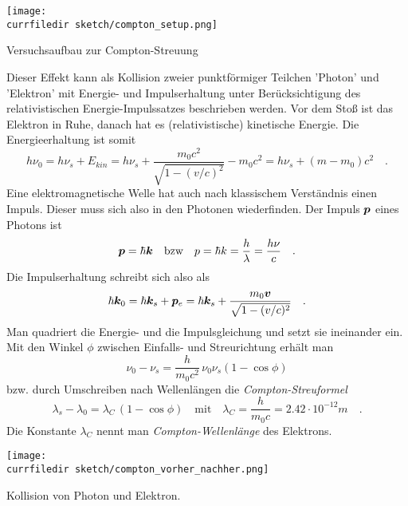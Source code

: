  \begin{marginfigure}
    \texttt{[image: \\currfiledir sketch/compton\_setup.png]}
    \caption{Versuchsaufbau zur Compton-Streuung}
\end{marginfigure}


 Dieser Effekt kann als Kollision zweier punktförmiger Teilchen 'Photon' und 'Elektron' mit Energie- und Impulserhaltung unter Berücksichtigung des relativistischen Energie-Impulssatzes beschrieben werden. Vor dem Stoß ist das Elektron in Ruhe, danach hat es (relativistische) kinetische Energie. Die Energieerhaltung ist somit
\begin{equation}
    h \nu_0 = h \nu_s + E_{kin} = h \nu_s + \frac{m_0 c^2}{\sqrt{1 - (v/c)^2}} - m_0 c^2 = h \nu_s + (m - m_0) c^2 \quad .
\end{equation}
Eine elektromagnetische Welle hat auch nach klassischem Verständnis einen Impuls. Dieser muss sich also in den Photonen wiederfinden. Der Impuls $\boldsymbol{p}$ eines Photons ist 
\begin{equation}
    \boldsymbol{p} = \hbar \boldsymbol{k} \quad \text{bzw} \quad p = \hbar k = \frac{h}{\lambda} = \frac{h \nu}{c} \quad .
    \label{eq:2_impuls_photon}
\end{equation}
Die Impulserhaltung schreibt sich also als
\begin{equation}
    \hbar \boldsymbol{k}_0 = \hbar \boldsymbol{k}_s + \boldsymbol{p}_e = \hbar \boldsymbol{k}_s + \frac{m_0 \boldsymbol{v}}{\sqrt{1 - (v/c)^2}} \quad .
\end{equation}
Man quadriert die Energie- und die Impulsgleichung und setzt sie ineinander ein. Mit den Winkel $\phi$ zwischen Einfalls- und Streurichtung erhält man
\begin{equation}
    \nu_0 - \nu_s = \frac{h}{m_0 c^2} \, \nu_0 \nu_s (1 - \cos \phi)
\end{equation}
bzw. durch Umschreiben nach Wellenlängen die \emph{Compton-Streuformel}
\begin{equation}
    \lambda_s - \lambda_0 =  \lambda_C \, (1 - \cos \phi) \quad \text{mit} \quad
    \lambda_C = \frac{h}{m_0 c} = 2.42 \cdot 10^{-12} m \quad .
\end{equation}
Die Konstante $\lambda_C$ nennt man \emph{Compton-Wellenlänge} des Elektrons.


\begin{marginfigure}
    \texttt{[image: \\currfiledir sketch/compton\_vorher\_nachher.png]}
    \caption{Kollision von Photon und Elektron.}
\end{marginfigure}


